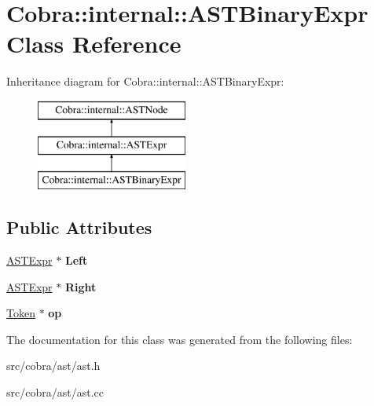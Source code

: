 \hypertarget{class_cobra_1_1internal_1_1_a_s_t_binary_expr}{\section{Cobra\+:\+:internal\+:\+:A\+S\+T\+Binary\+Expr Class Reference}
\label{class_cobra_1_1internal_1_1_a_s_t_binary_expr}
}
Inheritance diagram for Cobra\+:\+:internal\+:\+:A\+S\+T\+Binary\+Expr\+:\begin{figure}[H]
\begin{center}
\leavevmode
\includegraphics[height=3.000000cm]{class_cobra_1_1internal_1_1_a_s_t_binary_expr}
\end{center}
\end{figure}
\subsection*{Public Attributes}
\begin{DoxyCompactItemize}
\item 
\hypertarget{class_cobra_1_1internal_1_1_a_s_t_binary_expr_aeb1680fce98d2d2b17bf4d8751efea4d}{\hyperlink{class_cobra_1_1internal_1_1_a_s_t_expr}{A\+S\+T\+Expr} $\ast$ {\bfseries Left}}\label{class_cobra_1_1internal_1_1_a_s_t_binary_expr_aeb1680fce98d2d2b17bf4d8751efea4d}

\item 
\hypertarget{class_cobra_1_1internal_1_1_a_s_t_binary_expr_a7b1c52a1e71454681f675401344ea4c9}{\hyperlink{class_cobra_1_1internal_1_1_a_s_t_expr}{A\+S\+T\+Expr} $\ast$ {\bfseries Right}}\label{class_cobra_1_1internal_1_1_a_s_t_binary_expr_a7b1c52a1e71454681f675401344ea4c9}

\item 
\hypertarget{class_cobra_1_1internal_1_1_a_s_t_binary_expr_aa94555a0468455f9ad2d5a7f848d1ef9}{\hyperlink{class_cobra_1_1internal_1_1_token}{Token} $\ast$ {\bfseries op}}\label{class_cobra_1_1internal_1_1_a_s_t_binary_expr_aa94555a0468455f9ad2d5a7f848d1ef9}

\end{DoxyCompactItemize}


The documentation for this class was generated from the following files\+:\begin{DoxyCompactItemize}
\item 
src/cobra/ast/ast.\+h\item 
src/cobra/ast/ast.\+cc\end{DoxyCompactItemize}
